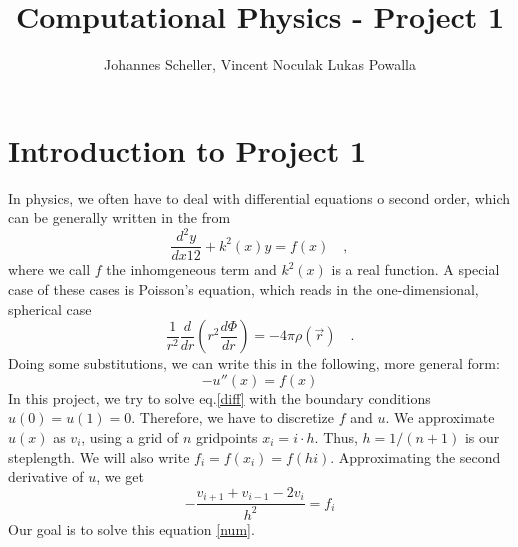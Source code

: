 \documentclass[10pt,a4paper]{article}
\author{Johannes Scheller, Vincent Noculak Lukas Powalla}
\title{Computational Physics - Project 1}
\begin{document}
\maketitle
\newpage
\tableofcontents
\newpage
\section{Introduction to Project 1}
In physics, we often have to deal with differential equations o second order, which can be generally written in the from
\begin{equation}
	\frac{d^{2}y}{dx1{2}}+k^2(x)y=f(x)\quad,
\end{equation}
where we call $f$ the inhomgeneous term and $k^2(x)$ is a real function. A special case of these cases is Poisson's equation, which reads in the one-dimensional, spherical case
\begin{equation}
	\frac{1}{r^2}\frac{d}{dr}\left(r^2\frac{d\Phi}{dr}\right)=-4\pi\rho\left(\vec{r}\right)\quad.
\end{equation}
Doing some substitutions, we can write this in the following, more general form:
\begin{equation}
	\label{diff}
	-u''(x)=f(x)
\end{equation}
In this project, we try to solve eq.\eqref{diff} with the boundary conditions $u(0)=u(1)=0$. Therefore, we have to discretize $f$ and $u$. We approximate $u(x)$ as $v_i$, using a grid of $n$ gridpoints $x_i=i\cdot h$. Thus, $h=1/(n+1)$ is our steplength. We will also write $f_i=f(x_i)=f(hi)$. Approximating the second derivative of $u$, we get
\begin{equation}
	\label{num}
	-\frac{v_{i+1}+v_{i-1}-2v_i}{h^2}=f_i
\end{equation}
Our goal is to solve this equation \eqref{num}.
\end{document}
